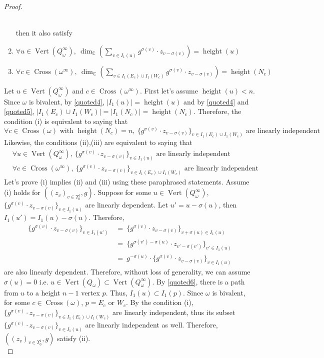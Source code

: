 \begin{proof}
\begin{enumerate}[label = (\roman*)]
\\
then it also satisfy\\
\item $\forall u\in \operatorname{Vert}(Q_\omega^\infty),~\operatorname{dim}_\mathbb{C}(\sum_{v\in I_1(u)} g^{\sigma(v)}\cdot z_{v-\sigma(v)}) = \operatorname{height}(u)$
\item $\forall c\in \operatorname{Cross}(\omega^\infty),~\operatorname{dim}_\mathbb{C}(\sum_{v\in I_1(E_c)\cup I_1(W_c)} g^{\sigma(v)}\cdot z_{v-\sigma(v)}) = \operatorname{height}(N_c)$
\end{enumerate}
Let $u\in \operatorname{Vert}(Q_\omega^\infty)$ and $c\in \operatorname{Cross}(\omega^\infty)$. First let's assume $\operatorname{height}(u)<n$. Since $\omega$ is bivalent, by \ref{quoted4}, $|I_1(u)|=\operatorname{height}(u)$ and by \ref{quoted4} and \ref{quoted5}, $|I_1(E_c)\cup I_1(W_c)| = |I_1(N_c)| = \operatorname{height}(N_c)$. Therefore, the condition (\Rn{1}) is equivalent to saying that 
\[
\forall c\in \operatorname{Cross}(\omega) \text{ with } \operatorname{height}(N_c) = n, ~\{g^{\sigma(v)}\cdot z_{v-\sigma(v)}\}_{v\in I_1(E_c)\cup I_1(W_c)}
\text{ are linearly independent}\] 
Likewise, the conditions (\Rn{2}),(\Rn{3}) are equivalent to saying that 
\begin{align*}
&\forall u\in \operatorname{Vert}(Q_\omega^\infty), ~\{g^{\sigma(v)}\cdot z_{v-\sigma(v)}\}_{v\in I_1(u)} \text{ are linearly independent} \\
&\forall c\in \operatorname{Cross}(\omega^\infty), ~\{g^{\sigma(v)}\cdot z_{v-\sigma(v)}\}_{v\in I_1(E_c)\cup I_1(W_c)}\text{ are linearly independent}
\end{align*}
Let's prove (\Rn{1}) implies (\Rn{2}) and (\Rn{3}) using these paraphrased statements. Assume (\Rn{1}) holds for $((z_v)_{v\in \Upsilon_0^1},g)$. Suppose for some $u\in \operatorname{Vert}(Q_\omega^\infty)$, $\{g^{\sigma(v)}\cdot z_{v-\sigma(v)}\}_{v\in I_1(u)}$ are linearly dependent. Let $u' = u-\sigma(u)$, then $I_1(u')=I_1(u)-\sigma(u)$. Therefore, 
\begin{align*}
\{g^{\sigma(v)}\cdot z_{v-\sigma(v)}\}_{v\in I_1(u')}~&=~\{g^{\sigma(v)}\cdot z_{v-\sigma(v)}\}_{v+\sigma(u)\in I_1(u)}\\
&=~\{g^{\sigma(v')-\sigma(u)}\cdot z_{v'-\sigma(v')}\}_{v'\in I_1(u)} \\
&=~g^{-\sigma(u)}\cdot\{g^{\sigma(v)}\cdot z_{v-\sigma(v)}\}_{v\in I_1(u)}
\end{align*}
are also linearly dependent. Therefore, without loss of generality, we can assume $\sigma(u) = 0$ i.e. $u\in \operatorname{Vert}(Q_\omega)\subset \operatorname{Vert}(Q_\omega^\infty)$. By \ref{quoted6}, there is a path from $u$ to a height $n-1$ vertex $p$. Thus, $I_1(u)\subset I_1(p)$. Since $\omega$ is bivalent, for some $c\in \operatorname{Cross}(\omega)$, $p=E_c\text{ or }W_c$. By the condition (\Rn{1}), $\{g^{\sigma(v)}\cdot z_{v-\sigma(v)}\}_{v\in I_1(E_c)\cup I_1(W_c)}$ are linearly independent, thus its subset $\{g^{\sigma(v)}\cdot z_{v-\sigma(v)}\}_{v\in I_1(u)}$ are linearly independent as well. Therefore, $((z_v)_{v\in\Upsilon_0^1},g)$ satisfy (\Rn{2}).\\

\end{proof}

